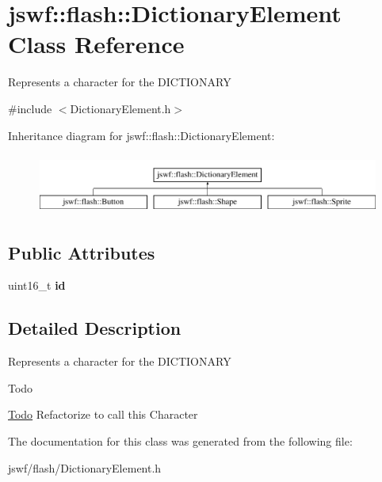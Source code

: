 \hypertarget{classjswf_1_1flash_1_1_dictionary_element}{\section{jswf\+:\+:flash\+:\+:Dictionary\+Element Class Reference}
\label{classjswf_1_1flash_1_1_dictionary_element}
}


Represents a character for the {\ttfamily D\+I\+C\+T\+I\+O\+N\+A\+R\+Y}  




{\ttfamily \#include $<$Dictionary\+Element.\+h$>$}

Inheritance diagram for jswf\+:\+:flash\+:\+:Dictionary\+Element\+:\begin{figure}[H]
\begin{center}
\leavevmode
\includegraphics[height=2.000000cm]{classjswf_1_1flash_1_1_dictionary_element}
\end{center}
\end{figure}
\subsection*{Public Attributes}
\begin{DoxyCompactItemize}
\item 
\hypertarget{classjswf_1_1flash_1_1_dictionary_element_a3e4cbe2a4dff2794e6f8156e4dda4064}{uint16\+\_\+t {\bfseries id}}\label{classjswf_1_1flash_1_1_dictionary_element_a3e4cbe2a4dff2794e6f8156e4dda4064}

\end{DoxyCompactItemize}


\subsection{Detailed Description}
Represents a character for the {\ttfamily D\+I\+C\+T\+I\+O\+N\+A\+R\+Y} 

\begin{DoxyRefDesc}{Todo}
\item[\hyperlink{todo__todo000001}{Todo}]Refactorize to call this {\ttfamily Character} \end{DoxyRefDesc}


The documentation for this class was generated from the following file\+:\begin{DoxyCompactItemize}
\item 
jswf/flash/Dictionary\+Element.\+h\end{DoxyCompactItemize}
